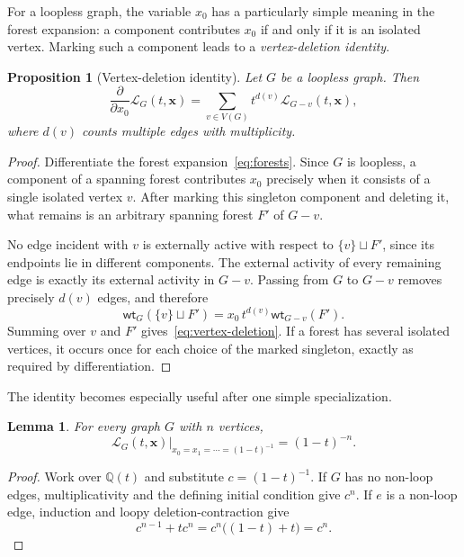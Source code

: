 \documentclass[11pt]{article}
\theoremstyle{plain}
\newtheorem{proposition}[theorem]{Proposition}
\newtheorem{lemma}[theorem]{Lemma}
\theoremstyle{definition}
\renewcommand{\mathcal}{\mathscr}
\newcommand{\LL}{\mathcal{L}}    %
\newcommand{\bx}{\mathbf{x}}
\newcommand{\wt}{\mathsf{wt}}
\newcommand{\QQ}{\mathbb Q}
\numberwithin{equation}{section}
\begin{document}
For a loopless graph, the variable $x_0$ has a particularly simple meaning in
the forest expansion: a component contributes $x_0$ if and only if it is an
isolated vertex.  Marking such a component
leads to a \emph{vertex-deletion identity}.

\begin{proposition}[Vertex-deletion identity]\label{prop:vertex-deletion}
Let $G$ be a loopless graph.  Then
\begin{equation}\label{eq:vertex-deletion}
   \frac{\partial}{\partial x_0}\LL_G(t,\bx)
   =
   \sum_{v\in V(G)}
   t^{d(v)}\LL_{G-v}(t,\bx),
\end{equation}
where $d(v)$ counts multiple edges with multiplicity.
\end{proposition}

\begin{proof}
  Differentiate the forest expansion~\eqref{eq:forests}.
Since $G$ is loopless, a component of a spanning forest contributes $x_0$ precisely when
it consists of a single isolated vertex $v$.  After marking this singleton
component and deleting it, what remains is an arbitrary spanning forest $F'$ of $G-v$.

No edge incident with $v$ is externally active with respect to
$\{v\}\sqcup F'$, since its endpoints lie in different components.
The external activity of every remaining edge is exactly its external activity
in $G-v$.  Passing from $G$ to $G-v$ removes precisely $d(v)$ edges, and therefore
\[
   \wt_G(\{v\}\sqcup F')
   =
   x_0\,t^{d(v)}\wt_{G-v}(F').
\]
Summing over $v$ and $F'$ gives~\eqref{eq:vertex-deletion}.
If a forest has several isolated vertices, it occurs once for each choice of the marked
singleton, exactly as required by differentiation.
\end{proof}

The identity becomes especially useful after one simple specialization.

\begin{lemma}\label{lem:constant-specialization}
For every graph $G$ with $n$ vertices,
\begin{equation}\label{eq:constant-specialization}
   \left.
      \LL_G(t,\bx)
   \right|_{x_0=x_1=\cdots=(1-t)^{-1}}
   =(1-t)^{-n}.
\end{equation}
\end{lemma}

\begin{proof}
Work over $\QQ(t)$ and substitute $c=(1-t)^{-1}$.  If $G$ has no non-loop
edges, multiplicativity and the defining initial condition give $c^n$.  If $e$ is a non-loop edge, induction and loopy deletion-contraction give
\[
   c^{n-1}+t c^n
   =c^n\bigl((1-t)+t\bigr)
   =c^n.
\]
\end{proof}
\end{document}
